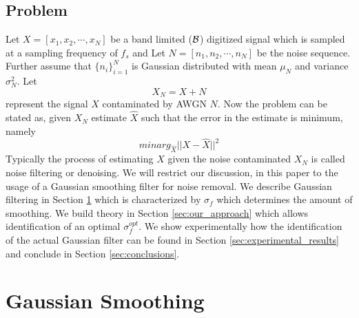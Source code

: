 \documentclass[journal,onecolumn]{IEEEtran}
\newcommand{\fs}{f_{s}}
\newcommand{\noise}{n}
\newcommand{\Noise}{N}
\newcommand{\Signal}{X}
\newcommand{\signal}{x}
\newcommand{\g}{f}
\newcommand{\BW}{{\cal B}}
\begin{document}
\subsection{Problem}
\label{sec:problem}
Let $\Signal = [ \signal_1, \signal_2, \cdots, \signal_N ]$ be a band 
limited ($\BW$) 
digitized signal which is sampled at a sampling frequency of $\fs$ and
Let 
$\Noise = [ \noise_1, \noise_2, \cdots, \noise_N ]$ be the noise sequence.
Further assume that $\{\noise_{i} \}_{i=1}^{N}$ is 
Gaussian distributed with mean $\mu_\Noise$ and variance 
$\sigma^2_\Noise$. Let 
 \begin{equation}\Signal_\Noise = \Signal + 
\Noise \label{eq:tdomain}
 \end{equation} 
represent the signal $\Signal$ 
contaminated by AWGN $\Noise$. 
Now the problem can be stated as, given 
$\Signal_\Noise$ estimate $\hat{\Signal}$ such that the error in the 
estimate is minimum, namely 
 \begin{equation} minarg_{\hat{\Signal}} || 
\Signal - \hat{\Signal} ||^2
 \end{equation} 
Typically the process of 
estimating $\hat{\Signal}$ given the noise contaminated 
${\Signal_\Noise}$ is called noise filtering or denoising. 
We will restrict our 
discussion, in this paper to the usage of a Gaussian smoothing filter for noise 
removal.
We 
describe Gaussian 
filtering in Section \ref{sec:gaussian_filtering} which is characterized 
by $\sigma_\g$ which determines the amount of smoothing. We build theory 
in Section \ref{sec:our_approach} 
which allows identification of an optimal $\sigma_\g^{opt}$. We show 
experimentally how the identification of the actual Gaussian filter can 
be found in Section \ref{sec:experimental_results} and conclude in 
Section \ref{sec:conclusions}.


\section{Gaussian Smoothing}
\label{sec:gaussian_filtering}
\end{document}
